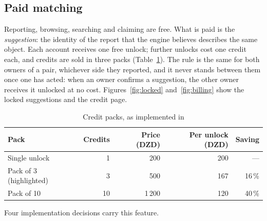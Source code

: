 
\subsection{Paid matching}
\label{sec:paid-matching}

Reporting, browsing, searching and claiming are free. What is paid is the
\emph{suggestion}: the identity of the report that the engine believes describes
the same object. Each account receives one free unlock; further unlocks cost one
credit each, and credits are sold in three packs (Table~\ref{tab:packs}). The
rule is the same for both owners of a pair, whichever side they reported, and
it never stands between them once one has acted: when an owner confirms a
suggestion, the other owner receives it unlocked at no cost.
Figures~\ref{fig:locked} and~\ref{fig:billing} show the locked suggestions and
the credit page.

\begin{table}[htbp]
\centering
\caption{Credit packs, as implemented in }
\label{tab:packs}
\small
\begin{tabular}{@{}l r r r r@{}}
\toprule
\textbf{Pack} & \textbf{Credits} & \textbf{Price (DZD)} & \textbf{Per unlock (DZD)} & \textbf{Saving} \\
\midrule
Single unlock & 1  & 200   & 200 & --- \\
Pack of 3 (highlighted) & 3  & 500   & 167 & 16\,\% \\
Pack of 10    & 10 & 1\,200 & 120 & 40\,\% \\
\bottomrule
\end{tabular}
\end{table}

Four implementation decisions carry this feature.

